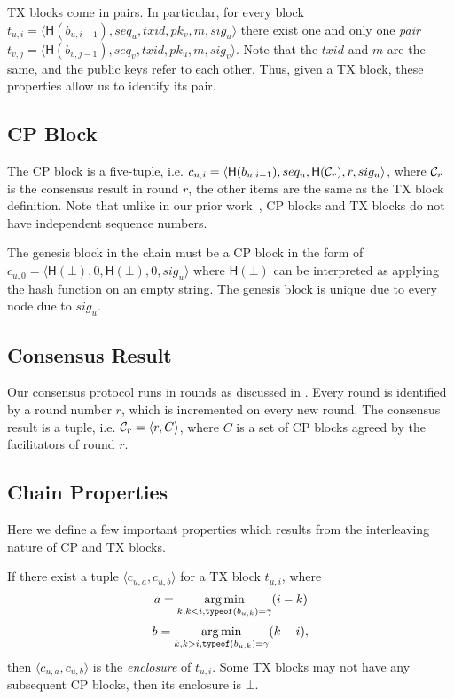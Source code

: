 TX blocks come in pairs.
In particular, for every block $t_{u, i} = \langle \textsf{H}(b_{u, i - 1}), seq_u, txid, pk_v, m, sig_u \rangle$
there exist one and only one \emph{pair} $t_{v, j} = \langle \textsf{H}(b_{v, j - 1}), seq_v, txid, pk_u, m, sig_v \rangle$.
Note that the $txid$ and $m$ are the same, and the public keys refer to each other.
Thus, given a TX block, these properties allow us to identify its pair.


\subsection{CP Block}

The CP block is a five-tuple, 
i.e. $c_{u, i} = \langle \textsf{H}(b_{u, i-1}), seq_u, \textsf{H}(\mathcal{C}_r), r, sig_u \rangle$,
where $\mathcal{C}_r$ is the consensus result in round $r$, the other items are the same as the TX block definition.
Note that unlike in our prior work~\cite{implicitconsensus}, CP blocks and TX blocks do not have independent sequence numbers.

The genesis block in the chain must be a CP block in the form of
$c_{u, 0} = \langle \textsf{H}(\bot), 0,  \textsf{H}(\bot), 0, sig_u \rangle$
where $\textsf{H}(\bot)$ can be interpreted as applying the hash function on an empty string.
The genesis block is unique due to every node due to $sig_u$.


\subsection{Consensus Result}
Our consensus protocol runs in rounds as discussed in .
Every round is identified by a round number $r$, which is incremented on every new round.
The consensus result is a tuple, i.e. $\mathcal{C}_r = \langle r, C \rangle$,
where $C$ is a set of CP blocks agreed by the facilitators of round $r$.

\subsection{Chain Properties}
Here we define a few important properties which results from the interleaving nature of CP and TX blocks.

If there exist a tuple $\langle c_{u,a}, c_{u, b} \rangle$ for a TX block $t_{u, i}$,
where 
$$a = \operatorname*{arg\,min}_{k, k < i, \texttt{typeof}(b_{u,k}) = \gamma}(i - k)$$
$$b = \operatorname*{arg\,min}_{k, k > i, \texttt{typeof}(b_{u,k}) = \gamma}(k - i),$$
then $\langle c_{u,a}, c_{u, b} \rangle$ is the \emph{enclosure} of $t_{u, i}$.
Some TX blocks may not have any subsequent CP blocks, then its enclosure is $\bot$.

